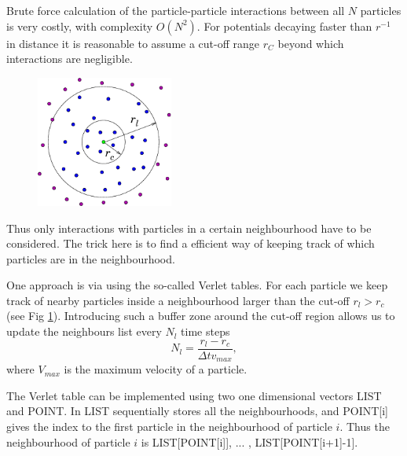 
Brute force calculation of the particle-particle interactions between all $N$ particles is very costly, with complexity $O(N^2)$. For potentials decaying faster than $r^{-1}$ in distance it is reasonable to assume a cut-off range $r_C$ beyond which interactions are negligible.

\begin{figure}
\vspace{-25pt}
  \centering
  \includegraphics[width=0.4\textwidth]{pics/verlet_table}
  \label{fig:verlet_table}
\end{figure}

\noindent Thus only interactions with particles in a certain neighbourhood have to be considered. The trick here is to find a efficient way of keeping track of which particles are in the neighbourhood. 

One approach is via using the so-called Verlet tables. For each particle we keep track of nearby particles inside a neighbourhood larger than the cut-off $r_l > r_c$ (see Fig \ref{fig:verlet_table}). Introducing such a buffer zone around the cut-off region allows us to update the neighbours list every $N_l$ time steps
\[
N_l= \frac{r_l - r_c }{\Delta t v_{max}},
\]  
where $V_{max}$ is the maximum velocity of a particle.

\clearpage %

The Verlet table can be implemented using two one dimensional vectors LIST and POINT. In LIST sequentially stores all the neighbourhoods, and POINT[i] gives the index to the first particle in the neighbourhood of particle $i$. Thus the neighbourhood of particle $i$ is LIST[POINT[i]], ... , LIST[POINT[i+1]-1].   


